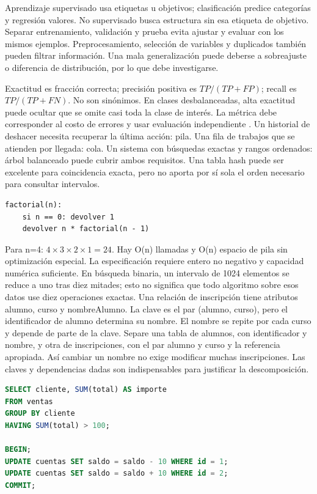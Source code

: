 Aprendizaje supervisado usa etiquetas u objetivos; clasificación predice categorías y regresión valores. No supervisado busca estructura sin esa etiqueta de objetivo. Separar entrenamiento, validación y prueba evita ajustar y evaluar con los mismos ejemplos. Preprocesamiento, selección de variables y duplicados también pueden filtrar información. Una mala generalización puede deberse a sobreajuste o diferencia de distribución, por lo que debe investigarse.

Exactitud es fracción correcta; precisión positiva es $TP/(TP+FP)$; recall es $TP/(TP+FN)$. No son sinónimos. En clases desbalanceadas, alta exactitud puede ocultar que se omite casi toda la clase de interés. La métrica debe corresponder al costo de errores y usar evaluación independiente \cite[capítulos Search y Learning]{ai}.
Un historial de deshacer necesita recuperar la última acción: pila. Una fila de trabajos que se atienden por llegada: cola. Un sistema con búsquedas exactas y rangos ordenados: árbol balanceado puede cubrir ambos requisitos. Una tabla hash puede ser excelente para coincidencia exacta, pero no aporta por sí sola el orden necesario para consultar intervalos.
\begin{lstlisting}
factorial(n):
    si n == 0: devolver 1
    devolver n * factorial(n - 1)
\end{lstlisting}
Para n=4: $4\times3\times2\times1=24$. Hay O(n) llamadas y O(n) espacio de pila sin optimización especial. La especificación requiere entero no negativo y capacidad numérica suficiente. En búsqueda binaria, un intervalo de 1024 elementos se reduce a uno tras diez mitades; esto no significa que todo algoritmo sobre esos datos use diez operaciones exactas.
Una relación de inscripción tiene atributos alumno, curso y nombreAlumno. La clave es el par (alumno, curso), pero el identificador de alumno determina su nombre. El nombre se repite por cada curso y depende de parte de la clave. Separe una tabla de alumnos, con identificador y nombre, y otra de inscripciones, con el par alumno y curso y la referencia apropiada. Así cambiar un nombre no exige modificar muchas inscripciones. Las claves y dependencias dadas son indispensables para justificar la descomposición.
\begin{lstlisting}[language=SQL]
SELECT cliente, SUM(total) AS importe
FROM ventas
GROUP BY cliente
HAVING SUM(total) > 100;

BEGIN;
UPDATE cuentas SET saldo = saldo - 10 WHERE id = 1;
UPDATE cuentas SET saldo = saldo + 10 WHERE id = 2;
COMMIT;
\end{lstlisting}
